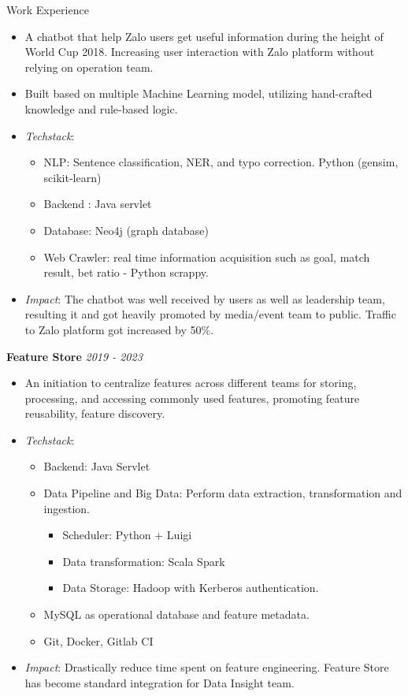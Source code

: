 \documentclass{resume} %
\begin{document}
\begin{rSection}{Work Experience}
\begin{itemize}
    \item A chatbot that help Zalo users get useful information during the height of World Cup 2018. Increasing user interaction with Zalo platform without relying on operation team.
    \item Built based on multiple Machine Learning model, utilizing hand-crafted knowledge and rule-based logic.
    \item \textit{Techstack}: 
    \begin{itemize}
            \item NLP: Sentence classification, NER, and typo correction. Python (gensim, scikit-learn)
            \item Backend : Java servlet
            \item Database: Neo4j (graph database)
            \item Web Crawler: real time information acquisition such as goal, match result, bet ratio - Python scrappy.
    \end{itemize}
    \item \textit{Impact}: The chatbot was well received by users as well as leadership team, resulting it and got heavily promoted by media/event team to public. Traffic to Zalo platform got increased by 50\%.
\end{itemize}

\newpage
\textbf{Feature Store} \hfill {\em \textit{2019 - 2023}}
\begin{itemize}
    \item An initiation to centralize features across different teams for storing, processing, and accessing commonly used features, promoting feature reusability, feature discovery.
    \item \textit{Techstack}:
    \begin{itemize}
        \item Backend: Java Servlet
        \item Data Pipeline and Big Data: Perform data extraction, transformation and ingestion.
        \begin{itemize}
            \item Scheduler: Python + Luigi 
            \item Data transformation: Scala Spark 
            \item Data Storage: Hadoop with Kerberos authentication.
        \end{itemize}
        \item MySQL as operational database and feature metadata.
        \item Git, Docker, Gitlab CI
    \end{itemize} 
    \item \textit{Impact}: Drastically reduce time spent on feature engineering. Feature Store has become standard integration for Data Insight team. 
\end{itemize}



\end{rSection}
\end{document}

